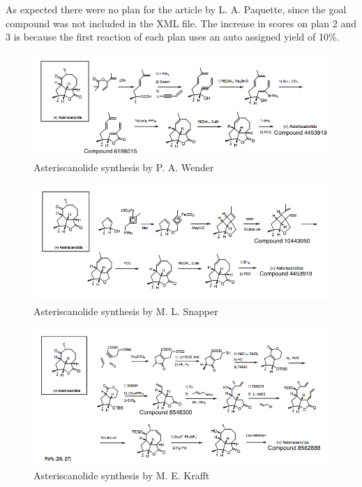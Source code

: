 \documentclass[a4paper,10pt,titlepage]{paper}
\begin{document}
As expected there were no plan for the article by L. A. Paquette, since the goal compound was not included in the XML file. The increase in scores on plan 2 and 3 is because the first reaction of each plan uses an auto assigned yield of 10\%. \\

\begin{figure}
\centering
\includegraphics[scale=0.5, angle=90]{Synteseplaner/Asteriscanolide/Wender.png}
\caption{Asteriscanolide synthesis by P. A. Wender \cite{SynthesisPlans}}
\label{fig::Wender}
\end{figure}

\begin{figure}
\centering
\includegraphics[scale=0.5, angle=90]{Synteseplaner/Asteriscanolide/Snapper.png}
\caption{Asteriscanolide synthesis by M. L. Snapper  \cite{SynthesisPlans}}
\label{fig::Snapper}
\end{figure}

\begin{figure}
\centering
\includegraphics[scale=0.5, angle=90]{Synteseplaner/Asteriscanolide/Krafft.png}
\caption{Asteriscanolide synthesis by M. E. Krafft \cite{SynthesisPlans}}
\label{fig::Krafft}
\end{figure}
\end{document}
